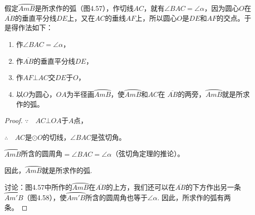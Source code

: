   \begin{analyze}
  假定$\wideparen{AmB}$是所求作的弧（图4.57），作切线${AC}$，就有$\angle BAC=\angle \alpha$，因为圆心$O$在$\overline{AB}$的垂直平分线$DE$上，又在$AC$的垂线$AF$上，所以圆心$O$是$DE$和$AF$的交点。于是得作法如下：
  \begin{enumerate}
    \item 作$\angle BAC=\angle \alpha$，
    \item 作$\overline{AB}$的垂直平分线$DE$，
    \item 作$AF\bot AC$交$DE$于$O$，
    \item 以$O$为圆心，$OA$为半径画$\wideparen{AmB}$，使$\wideparen{AmB}$和$AC$在
    $\overline{AB}$的两旁，$\wideparen{AmB}$就是所求作的弧。
  \end{enumerate}
  \end{analyze}
  
  \begin{proof}
  $\because\quad AC\bot OA$于$A$点，
  
  $\therefore\quad AC$是$\odot O$的切线，$\angle BAC$是弦切角。
  
  $\wideparen{AmB}$所含的圆周角$=\angle BAC=\angle \alpha$（弦切角定理的推论）。
  
  因此，$\wideparen{AmB}$就是所求作的弧.
  
  讨论：图4.57中所作的$\wideparen{AmB}$在$\overline{AB}$的上方，我们还可以在$\overline{AB}$的下方作出另一条$\wideparen{Am'B}$（图4.58），使$\wideparen{Am'B}$所含的圆周角也等于$\angle \alpha$. 因此，所求作的弧有两条。
  \end{proof}
  
